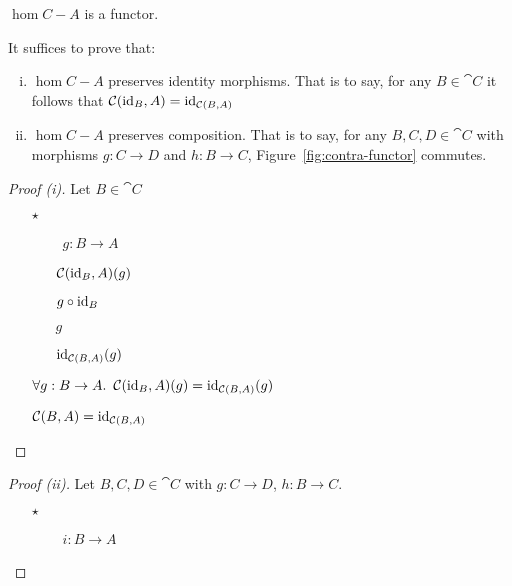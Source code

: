 \begin{prop}
  $\hom{C}{-}{A}$ is a functor.

  It suffices to prove that:
  \begin{enumerate}[(i)]
    \item $\hom{C}{-}{A}$ preserves identity morphisms. That is to say, for any $B\in\cat{C}$ it follows that $\mathcal{C}(\operatorname{id}_B, A) = \operatorname{id}_{\mathcal{C}(B, A)}$
    \item $\hom{C}{-}{A}$ preserves composition. That is to say, for any $B,C,D\in\cat{C}$ with morphisms $g : C \to D$
      and $h : B \to C$, Figure~\ref{fig:contra-functor} commutes.
  \end{enumerate}

  \begin{proof}[Proof (i)]
    Let $B\in\cat{C}$
    \begin{itemize}
      \item[$\star$]
        \begin{itemize}
            \item[\phs] \Let~$g : B \to A$
              \marginnote{\Hyp}
            \item[\phs]
              $\mathcal{C}(\operatorname{id}_B, A)(g)$

            \item[\eqs]
              $g\circ\operatorname{id}_B$
              \marginnote{\Def-\ref{def:contra-hom}}

            \item[\eqs]
              $g$
              \marginnote{\Def-$\id$}

            \item[\eqs]
              $\operatorname{id}_{\mathcal{C}(B, A)}(g)$
              \marginnote{\Def-$\id$}
        \end{itemize}

      \item[\imps]
        $\forall g : B \to A\ldotp~\mathcal{C}(\operatorname{id}_B, A)(g) = \operatorname{id}_{\mathcal{C}(B, A)}(g)$
        \marginnote{$\forall$-\Intro-$\star$}

      \item[\iffs]
        $\mathcal{C}(B, A) = \operatorname{id}_{\mathcal{C}(B, A)}$
        \marginnote{\Def-=}
        \qedhere
    \end{itemize}
  \end{proof}

  \begin{proof}[Proof (ii)]
    Let $B, C, D\in\cat{C}$ with ${g : C\to D}$, ${h : B\to C}$.
    \begin{itemize}
      \item[$\star$]
        \begin{itemize}
          \item[\phs] \Let~$i : B\to A$
            \marginnote{\Hyp}


\end{itemize}
\end{itemize}
\end{proof}
\end{prop}
